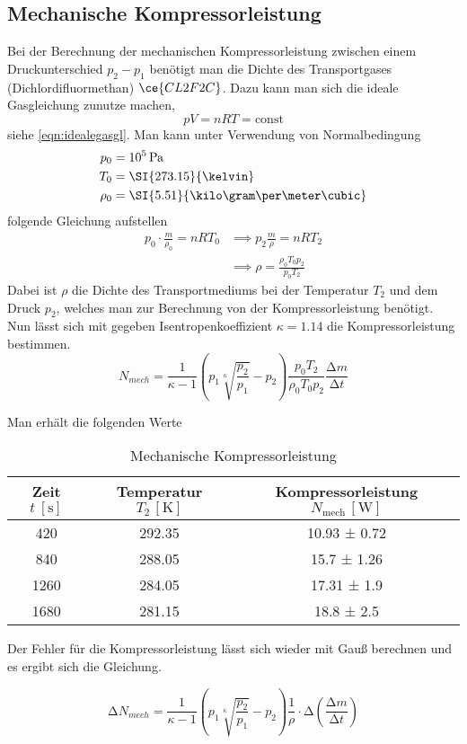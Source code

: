\subsection{Mechanische Kompressorleistung}
Bei der Berechnung der mechanischen Kompressorleistung zwischen einem Druckunterschied $p_{2} - p_{1}$ benötigt man die Dichte des Transportgases (Dichlordifluormethan) $\ce{CL2F2C}$.
Dazu kann man sich die ideale Gasgleichung zunutze machen,
\begin{equation}
pV = n R T = \text{const}
\end{equation}
siehe \eqref{eqn:idealegasgl}. Man kann unter Verwendung von Normalbedingung
\begin{align}
p_{0} &= 10^{5} \, \text{Pa} \\
T_{0} &= \SI{273.15}{\kelvin} \\
\rho_{0} &= \SI{5.51}{\kilo\gram\per\meter\cubic}
\end{align}
folgende Gleichung aufstellen
\begin{align}
p_{0} \cdot \frac{m}{\rho_{0}} = nR T_{0} &\implies p_{2} \frac{m}{\rho} = nR T_{2} \\
&\implies \rho = \frac{\rho_{0}T_{0}p_{2}}{p_{0}T_{2}}
\end{align}
Dabei ist $\rho$ die Dichte des Transportmediums bei der Temperatur $T_{2}$ und dem Druck $p_{2}$, welches man zur Berechnung von der Kompressorleistung benötigt.
Nun lässt sich mit gegeben Isentropenkoeffizient $\kappa = 1.14$ die Kompressorleistung bestimmen.
\begin{equation}
N_{mech} = \frac{1}{\kappa - 1} \left( p_{1}\sqrt[\kappa]{\frac{p_{2}}{p_{1}}} - p_{2} \right) \frac{p_{0}T_{2}}{\rho_{0}T_{0}p_{2}} \frac{\increment m}{\increment t}
\end{equation}
\newpage
\begin{flushleft}
Man erhält die folgenden Werte
\end{flushleft}
\begin{table}
  \centering
  \caption{Mechanische Kompressorleistung}
  \label{tab:mechkompr}
  \begin{tabular}{c c c}
    \toprule
    Zeit {$t \: [\si{\second}]$} & Temperatur $T_{2} \, [\si{\kelvin}]$ & Kompressorleistung $N_\text{mech} \, [\si{\watt}]$ \\
    \midrule
    420  & 292.35 & 10.93 ± 0.72 \\
    840  & 288.05 & 15.7 ± 1.26 \\
    1260  &  284.05 & 17.31 ± 1.9 \\
    1680 &  281.15 & 18.8 ± 2.5\\
    \bottomrule
  \end{tabular}
\end{table}
\begin{flushleft}
Der Fehler für die Kompressorleistung lässt sich wieder mit Gauß berechnen und es ergibt sich die Gleichung.
\end{flushleft}
\begin{equation}
  \increment N_{mech} = \frac{1}{\kappa - 1} \left( p_{1}\sqrt[\kappa]{\frac{p_{2}}{p_{1}}} - p_{2} \right) \frac{1}{\rho} \cdot \increment \left( \frac{\increment m}{\increment t} \right)
\end{equation}
